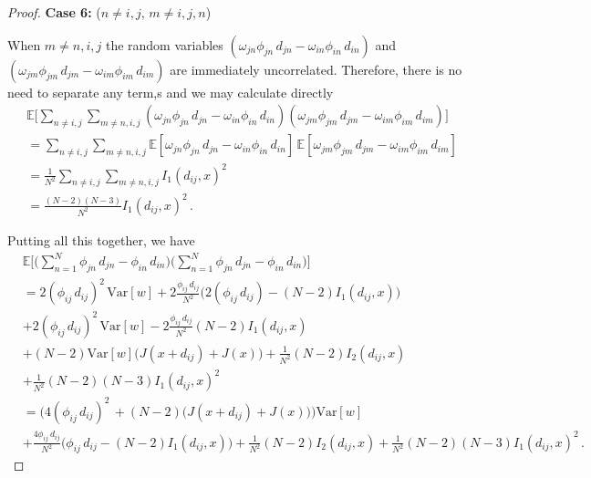\documentclass{article}
\newcommand{\EE}{\mathds{E}}
\newcommand{\var}{\text{Var}}
\begin{document}
\begin{proof}
    \textbf{Case 6:} ($n\neq i,j$, $m\neq i,j,n$)
    
    When $m\neq n,i,j$ the random variables $(\omega_{jn} \phi_{jn} \, d_{jn} - \omega_{in} \phi_{in} \, d_{in})$ and $(\omega_{jm} \phi_{jm} \, d_{jm} - \omega_{im} \phi_{im} \, d_{im})$ are immediately uncorrelated. Therefore, there is no need to separate any term,s and we may calculate directly
    \begin{align*}
        &\EE\Bigg[\sum_{n\neq i,j} \sum_{m\neq n,i,j} ( \omega_{jn} \phi_{jn} \, d_{jn} - \omega_{in} \phi_{in} \, d_{in})( \omega_{jm} \phi_{jm} \, d_{jm} - \omega_{im} \phi_{im} \, d_{im}) \Bigg] \\
        &= \sum_{n\neq i,j} \sum_{m\neq n,i,j}\EE[\omega_{jn} \phi_{jn} \, d_{jn} - \omega_{in} \phi_{in} \, d_{in}]\,\EE[\omega_{jm} \phi_{jm} \, d_{jm} - \omega_{im} \phi_{im} \, d_{im}] \\
        &= \frac{1}{N^2}\sum_{n\neq i,j} \sum_{m\neq n,i,j} I_1(d_{ij},x)^2 \\
        &= \frac{(N-2)(N-3)}{N^2} I_1(d_{ij},x)^2 \,.
    \end{align*}
    
    Putting all this together, we have
    \begin{align*}
        &\EE\Bigg[ \bigg(\sum_{n=1}^N \phi_{jn} \, d_{jn} - \phi_{in} \, d_{in}\bigg) \bigg(\sum_{n=1}^N \phi_{jn} \, d_{jn} - \phi_{in} \, d_{in}\bigg) \Bigg] \\
        &= 2(\phi_{ij} \, d_{ij} )^2 \, \var[w]  
        + 2\frac{\phi_{ij} \, d_{ij}}{N^2} \Bigg( 2(\phi_{ij} \, d_{ij} )
        - (N-2) I_1(d_{ij},x) \Bigg) \\
        &+ 2(\phi_{ij} \, d_{ij} )^2 \, \var[w]  
        - 2\frac{\phi_{ij} \, d_{ij}}{N^2} (N-2) I_1(d_{ij},x) \\
        &+  (N-2) \var[w] \Big(J(x + d_{ij}) + J(x) \Big) + \frac{1}{N^2} (N-2) I_2(d_{ij},x) \\
        &+ \frac{1}{N^2} (N-2)(N-3) I_1(d_{ij},x)^2 \\
        &= \Big( 4(\phi_{ij} \, d_{ij} )^2 \, + (N-2) \big(J(x + d_{ij}) + J(x) \big) \Big) \var[w] \\
        &+  \frac{4\phi_{ij} \, d_{ij}}{N^2} \Big( \phi_{ij} \, d_{ij} 
        - (N-2) I_1(d_{ij},x)\Big) + \frac{1}{N^2} (N-2) I_2(d_{ij},x) + \frac{1}{N^2} (N-2)(N-3) I_1(d_{ij},x)^2 \,.
    \end{align*}
    

\end{proof}
\end{document}

